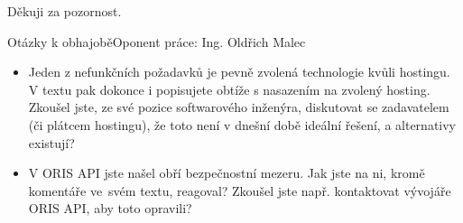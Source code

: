 \documentclass[aspectratio=169]{beamer}
\begin{document}
\begin{frame}
    Děkuji za pozornost.
\end{frame}

\appendix

\begin{frame}{Otázky k obhajobě}{Oponent práce: Ing. Oldřich Malec}
    \begin{itemize}
        \justifying
        \item Jeden z nefunkčních požadavků je pevně zvolená technologie kvůli hostingu. V textu pak dokonce i popisujete obtíže s nasazením na zvolený hosting. Zkoušel jste, ze své pozice softwarového inženýra, diskutovat se zadavatelem (či plátcem hostingu), že toto není v dnešní době ideální řešení, a alternativy existují?
        \item V ORIS API jste našel obří bezpečnostní mezeru. Jak jste na ni, kromě komentáře ve~svém textu, reagoval? Zkoušel jste např. kontaktovat vývojáře ORIS API, aby toto opravili?
    \end{itemize}
\end{frame}
\end{document}
